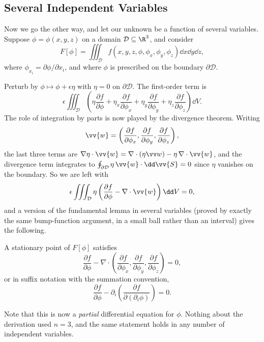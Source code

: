 \subsection{Several Independent Variables}

Now we go the other way, and let our unknown be a function of several variables. Suppose $\phi = \phi(x, y, z)$ on a domain $\mathcal{D}\subseteq \R^3$, and consider
$$
F[\phi] = \iiint_{\mathcal{D}} f\left(x, y, z, \phi, \phi_x, \phi_y, \phi_z\right)\dd x \dd y \dd z,
$$
where $\phi_{x_i} = \partial\phi/\partial x_i$, and where $\phi$ is prescribed on the boundary $\partial \mathcal{D}$.

Perturb by $\phi \mapsto \phi + \epsilon \eta$ with $\eta = 0$ on $\partial\mathcal D$. The first-order term is
$$
\epsilon\iiint_{\mathcal D}\left(\eta \frac{\partial f}{\partial \phi} + \eta_x \frac{\partial f}{\partial \phi_x} + \eta_y \frac{\partial f}{\partial \phi_y} + \eta_z \frac{\partial f}{\partial \phi_z}\right)\dd V.
$$
The role of integration by parts is now played by the divergence theorem. Writing
$$
\vv{w} = \left(\frac{\partial f}{\partial \phi_x}, \frac{\partial f}{\partial \phi_y}, \frac{\partial f}{\partial \phi_z}\right),
$$
the last three terms are $\nabla \eta \cdot \vv{w} = \nabla\cdot(\eta \vv w) - \eta\, \nabla\cdot \vv{w}$, and the divergence term integrates to $\oint_{\partial \mathcal D}\eta\, \vv{w}\cdot \dd \vv{S} = 0$ since $\eta$ vanishes on the boundary. So we are left with
$$
\epsilon\iiint_{\mathcal D}\eta\left(\frac{\partial f}{\partial \phi} - \nabla\cdot\vv{w}\right)\dd V = 0,
$$
and a version of the fundamental lemma in several variables (proved by exactly the same bump-function argument, in a small ball rather than an interval) gives the following.

\begin{theorem}
	A stationary point of $F[\phi]$ satisfies
	$$
	\frac{\partial f}{\partial \phi} - \nabla\cdot\left(\frac{\partial f}{\partial \phi_x}, \frac{\partial f}{\partial \phi_y}, \frac{\partial f}{\partial \phi_z}\right) = 0,
	$$
	or in suffix notation with the summation convention,
	$$
	\frac{\partial f}{\partial \phi} - \partial_i\left(\frac{\partial f}{\partial (\partial_i \phi)}\right) = 0.
	$$
\end{theorem}

Note that this is now a \emph{partial} differential equation for $\phi$. Nothing about the derivation used $n = 3$, and the same statement holds in any number of independent variables.

